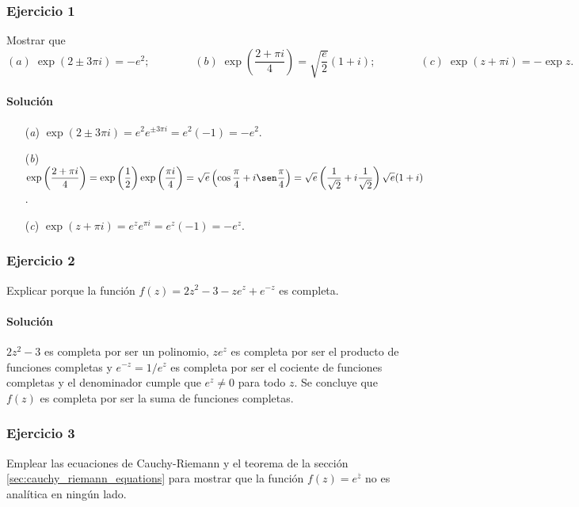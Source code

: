 \documentclass[a4paper]{report}
\begin{document}
\subsubsection{Ejercicio 1}

Mostrar que 
\[
 (\textit{a})\;\exp(2\pm3\pi i)=-e^2;\qquad\qquad 
 (\textit{b})\;\exp\left(\frac{2+\pi i}{4}\right)=\sqrt{\frac{e}{2}}(1+i);\qquad\qquad
 (\textit{c})\;\exp(z+\pi i)=-\exp z.
\]

\paragraph{Solución} 

\begin{enumerate}
 \item[(\textit{a})] \(\exp(2\pm3\pi i)=e^2e^{\pm3\pi i}=e^2(-1)=-e^2\).
 \item[(\textit{b})] \(\displaystyle\exp\left(\frac{2+\pi i}{4}\right)=\exp\left(\frac{1}{2}\right)\exp\left(\frac{\pi i}{4}\right)=\sqrt{e}\left(\cos\frac{\pi}{4}+i\sen\frac{\pi}{4}\right)=\sqrt{e}\left(\frac{1}{\sqrt{2}}+i\frac{1}{\sqrt{2}}\right)\sqrt{e}(1+i)\).
 \item[(\textit{c})] \(\exp(z+\pi i)=e^ze^{\pi i}=e^z(-1)=-e^z\).
\end{enumerate}

\subsubsection{Ejercicio 2}

Explicar porque la función \(f(z)=2z^2-3-ze^z+e^{-z}\) es completa.

\paragraph{Solución} \(2z^2-3\) es completa por ser un polinomio, \(ze^z\) es completa por ser el producto de funciones completas y \(e^{-z}=1/e^z\) es completa por ser el cociente de funciones completas y el denominador cumple que \(e^z\neq 0\) para todo \(z\). Se concluye que \(f(z)\) es completa por ser la suma de funciones completas.

\subsubsection{Ejercicio 3}

Emplear las ecuaciones de Cauchy-Riemann y el teorema de la sección \ref{sec:cauchy_riemann_equations} para mostrar que la función \(f(z)=e^{\overline{z}}\) no es analítica en ningún lado.
\end{document}

